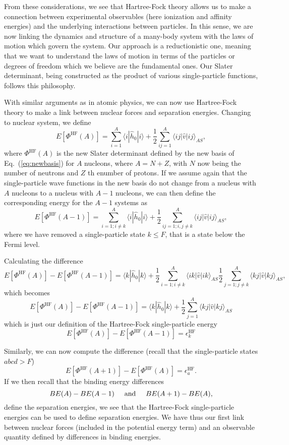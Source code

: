 \documentclass[%
twoside,                 %
final,                   %
10pt]{article}
\begin{document}
From these considerations, we see that Hartree-Fock theory allows us to make a connection between experimental 
observables (here ionization and affinity energies) and the underlying interactions between particles.  
In this sense, we are now linking the dynamics and structure of a many-body system with the laws of motion which govern the system. Our approach is a reductionistic one, meaning that we want to understand the laws of motion 
in terms of the particles or degrees of freedom which we believe are the fundamental ones. Our Slater determinant, being constructed as the product of various single-particle functions, follows this philosophy.




With similar arguments as in atomic physics, we can now use Hartree-Fock theory to make a link
between nuclear forces and separation energies. Changing to nuclear system, we define
\[
  E[\Phi^{\mathrm{HF}}(A)] 
  = \sum_{i=1}^A \langle i | \hat{h}_0 | i \rangle +
  \frac{1}{2}\sum_{ij=1}^A\langle ij|\hat{v}|ij\rangle_{AS},
\]
where $\Phi^{\mathrm{HF}}(A)$ is the new Slater determinant defined by the new basis of Eq.~(\ref{eq:newbasis})
for $A$ nucleons, where $A=N+Z$, with $N$ now being the number of neutrons and $Z$ th enumber of protons.  If we assume again that the single-particle wave functions in the new basis do not change from a nucleus with $A$ nucleons to a nucleus with $A-1$  nucleons, we can then define the corresponding energy for the $A-1$ systems as 
\[
  E[\Phi^{\mathrm{HF}}(A-1)] 
  = \sum_{i=1; i\ne k}^A \langle i | \hat{h}_0 | i \rangle +
  \frac{1}{2}\sum_{ij=1;i,j\ne k}^A\langle ij|\hat{v}|ij\rangle_{AS},
\]
where we have removed a single-particle state $k\le F$, that is a state below the Fermi level.  




Calculating the difference 
\[
  E[\Phi^{\mathrm{HF}}(A)]-   E[\Phi^{\mathrm{HF}}(A-1)] 
  = \langle k | \hat{h}_0 | k \rangle +
  \frac{1}{2}\sum_{i=1;i\ne k}^A\langle ik|\hat{v}|ik\rangle_{AS}  \frac{1}{2}\sum_{j=1;j\ne k}^A\langle kj|\hat{v}|kj\rangle_{AS},
\]
which becomes 
\[
  E[\Phi^{\mathrm{HF}}(A)]-   E[\Phi^{\mathrm{HF}}(A-1)] 
  = \langle k | \hat{h}_0 | k \rangle +
  \frac{1}{2}\sum_{j=1}^A\langle kj|\hat{v}|kj\rangle_{AS}
\]
which is just our definition of the Hartree-Fock single-particle energy
\[
  E[\Phi^{\mathrm{HF}}(A)]-   E[\Phi^{\mathrm{HF}}(A-1)] 
  = \epsilon_k^{\mathrm{HF}} 
\]




Similarly, we can now compute the difference (recall that the single-particle states $abcd > F$)
\[
  E[\Phi^{\mathrm{HF}}(A+1)]-   E[\Phi^{\mathrm{HF}}(A)]= \epsilon_a^{\mathrm{HF}}. 
\]
If we then recall that the binding energy differences 
\[
BE(A)-BE(A-1) \hspace{0.5cm} \mathrm{and} \hspace{0.5cm} BE(A+1)-BE(A), 
\]
define the separation energies, we see that the Hartree-Fock single-particle energies can be used to
define separation energies. We have thus our first link between nuclear forces (included in the potential energy term) and an observable quantity defined by differences in binding energies. 
\end{document}
